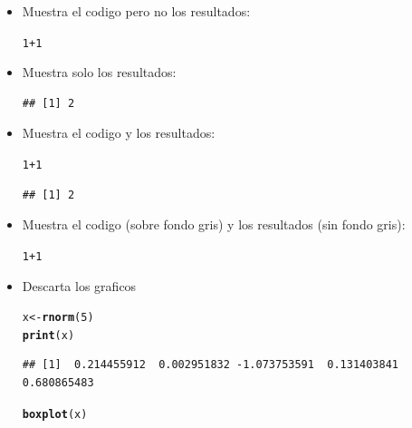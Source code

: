 \documentclass[12pt,a4paper]{article}\usepackage[]{graphicx}\usepackage[]{color}
\makeatletter
\newcommand{\hlnum}[1]{\textcolor[rgb]{0.686,0.059,0.569}{#1}}%
\newcommand{\hlopt}[1]{\textcolor[rgb]{0,0,0}{#1}}%
\newcommand{\hlstd}[1]{\textcolor[rgb]{0.345,0.345,0.345}{#1}}%
\newcommand{\hlkwb}[1]{\textcolor[rgb]{0.69,0.353,0.396}{#1}}%
\newcommand{\hlkwd}[1]{\textcolor[rgb]{0.737,0.353,0.396}{\textbf{#1}}}%
\newenvironment{kframe}{%
 \def\at@end@of@kframe{}%
 \ifinner\ifhmode%
  \def\at@end@of@kframe{\end{minipage}}%
  \begin{minipage}{\columnwidth}%
 \fi\fi%
 \def\FrameCommand##1{\hskip\@totalleftmargin \hskip-\fboxsep
 \colorbox{shadecolor}{##1}\hskip-\fboxsep
     \hskip-\linewidth \hskip-\@totalleftmargin \hskip\columnwidth}%
 \MakeFramed {\advance\hsize-\width
   \@totalleftmargin\z@ \linewidth\hsize
   \@setminipage}}%
 {\par\unskip\endMakeFramed%
 \at@end@of@kframe}
\newenvironment{knitrout}{}{} %
\makeatother
\begin{document}
\begin{itemize}

\item Muestra el codigo pero no los resultados: 

\begin{knitrout}
\color{fgcolor}\begin{kframe}
\begin{alltt}
\hlnum{1} \hlopt{+} \hlnum{1}
\end{alltt}
\end{kframe}
\end{knitrout}

\item Muestra solo los resultados:

\begin{knitrout}
\color{fgcolor}\begin{kframe}
\begin{verbatim}
## [1] 2
\end{verbatim}
\end{kframe}
\end{knitrout}

\item Muestra el codigo y los resultados:

\begin{knitrout}
\color{fgcolor}\begin{kframe}
\begin{alltt}
\hlnum{1} \hlopt{+} \hlnum{1}
\end{alltt}
\begin{verbatim}
## [1] 2
\end{verbatim}
\end{kframe}
\end{knitrout}

\item Muestra el codigo (sobre fondo gris) y los resultados (sin fondo gris):

\begin{kframe}
\begin{alltt}
\hlnum{1} \hlopt{+} \hlnum{1}
\end{alltt}
\end{kframe}[1] 2


\item Descarta los graficos

\begin{knitrout}
\color{fgcolor}\begin{kframe}
\begin{alltt}
\hlstd{x} \hlkwb{<-} \hlkwd{rnorm}\hlstd{(}\hlnum{5}\hlstd{)}
\hlkwd{print}\hlstd{(x)}
\end{alltt}
\begin{verbatim}
## [1]  0.214455912  0.002951832 -1.073753591  0.131403841  0.680865483
\end{verbatim}
\begin{alltt}
\hlkwd{boxplot}\hlstd{(x)}
\end{alltt}
\end{kframe}
\end{knitrout}


\end{itemize}
\end{document}
